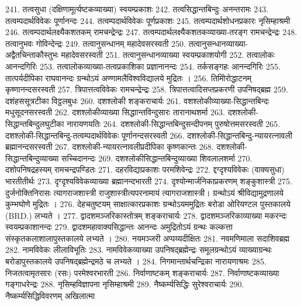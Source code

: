 241. तत्वसुधा (दक्षिणामूर्त्यष्टकव्याख्या) स्वयम्प्रकाशः
242. तत्वसिद्धान्तबिन्दुः				अनन्तरामः
243. तत्वम्पदार्थविवेकः					पूर्णानन्दः
244. तत्वम्पदार्थविवेकः					पूर्णप्रकाशः
245.	तत्वम्पदार्थशोधनप्रकारः			नृसिम्हाश्रमी
246. तत्वम्पदार्थलक्ष्यैकशतकम् 		रामचन्द्रेन्द्रः
247. तत्वम्पदार्थलक्ष्यैकशतकव्याख्या-तरङ्ग रामचन्द्रेन्द्रः
248. तत्वानुभवः						गोविन्देन्द्रः
249. तत्वानुसन्धानम् 					महादेवसरस्वती
250. तत्वानुसन्धानव्याख्या-अद्वैतचिन्ताकौस्तुभः महादेवसरस्वती
251. तत्वानुसन्धानव्याख्या				स्वयम्प्रकाशयोगी
252. तत्वालोकः						आनन्दगिरिः
253. तत्वालोकव्याख्या-तत्वप्रकाशिका प्रज्ञानानन्दः
254. तर्कसङ्गहः							आनन्दगिरिः
255. तात्पर्यदीपिका						राघवानन्दः 
	    ग्रन्थोऽयं अण्णामलैविश्वविद्यालये मुद्रितः ।
256. तिमिोरोद्धाटनम् 					कृष्णानन्दसरस्वती
257. त्रिपात्तत्वविवेकः					रामचन्द्रेन्द्रः
258. त्रिपात्तत्वादिसप्तप्रकरणी			उपनिषद्ब्रह्म
259. दशंहससूत्रटीका					विट्ठलबुधः
260. दशश्लोकी							शङ्कराचार्यः
261. वशश्लोकीव्याख्या-सिद्धान्तबिन्दः मधुसूदनसरस्वती
262. दशश्लोकीव्याख्या सिद्धाान्तविन्दुसारः तारानाथशर्मा
263. दशश्लोकी-सिद्धान्तबिन्दुलघुटीका नारायणयतिः
264. दशश्लोकी-सिद्धान्तबिन्दुसन्दीपनम् पुरुषोत्तमसरस्वती
265. दशश्लोकी-सिद्धान्तबिन्दु-तत्वम्पदार्थविवेकः पूर्णानन्दसरस्वती 
266. दशश्लोकी-सिद्धान्तबिन्दु-न्यायरत्नावली ब्रह्मानन्दसरस्वती
267. दशश्लोकी-न्यायरत्नावलीप्रदीपिका कृष्णकान्तः
268. दशश्लोकी-सिद्धान्तबिन्दुव्याख्या सच्चिदानन्दः
269. दशश्लोकीसिद्धान्तबिन्दुव्याख्या 	शिवलालशर्मा
270. दशोपनिषद्रहस्यम् 				रामचन्द्रपण्डितः
271. दहरविद्याप्रकाशः					परमशिवेन्द्रः
272. द्दग्दृश्यविवेकः (वाक्यसुधा)		भारतीतीर्थः
273. दृग्दृश्यविवेकव्याख्या 				ब्रह्मानन्दभारती
274. दृश्योन्मार्जनिकाप्रकरणम् 		शङ्कुशास्त्री
275. दुर्जनोक्तिनिरासः 					त्यागराजशास्त्री
	   राजुशास्त्रीत्यपरनामायं त्यागराजशास्त्री। ग्रन्थोऽयं श्रीविद्यामुद्रणालये कुम्भघोणे मुद्रितः । 
276. देहचतुष्टयम् 						साक्षात्कारप्रकाशः
	    ग्रन्थोऽयममुद्रितः बरोडा ओरियण्टल पुस्तकालये (BRD.) लभ्यते । 
277. द्वादशमञ्जरिकास्तोत्रम् 			शङ्कराचार्यः
278. द्वादशमञ्जरिकाव्याख्या मकरन्दः	स्वयम्प्रकाशानन्दः
279. द्वादशमहावाक्यसिद्धान्तः			आनन्दः
	   अमुद्रितोऽयं ग्रन्थः कल्कत्ता संस्कृतकलाशालापुस्तकालये लभ्यते । 
280. नयमञ्जरी 							अप्पय्यदीक्षितः
281. नवमणिमाला						सदाशिवब्रह्म
282. नामविवेकः						लीलाविभूतिः
283. नामविवेकव्याख्या					उपनिषद्ब्रह्मेन्द्रः
	   समूलग्रन्थोऽयं व्याख्याग्रन्थः बरोडापुस्तकालये उपनिषद्ब्रह्मेन्द्रमठे च लभ्यते ।
284. निगमान्तार्थचन्द्रिका 				नारायणाश्रमः 
285. निजतत्वामृतसारः (रसः)		परमेश्वरभारती
286. निर्वाणाष्टकम् 						शङ्कराचार्यः
287. निर्वाणाष्टकव्याख्या				गङ्गाधरेन्द्रः
288. नृसिम्हविज्ञापना					नृसिम्हाश्रमी
289. नैष्कर्म्यसिद्धिः						सुरेश्वराचार्यः
290. नैष्कर्म्यसिद्धिविवरणम् 			अखिलात्मा
